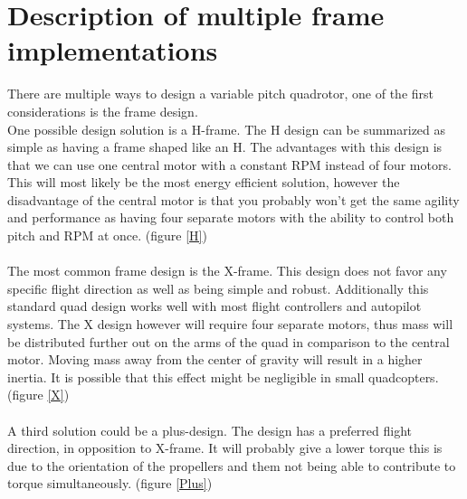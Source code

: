 \section{Description of multiple frame implementations}

There are multiple ways to design a variable pitch quadrotor, one of the first considerations is the frame design. 
\\
One possible design solution is a H-frame. The H design can be summarized as simple as having a frame shaped like an H. The advantages with this design is that we can use one central motor with a constant RPM instead of four motors. This will most likely be the most energy efficient solution, however the disadvantage of the central motor is that you probably won't  get the same agility and performance as having four separate motors with the ability to control both pitch and RPM at once. (figure \ref{H})
\\\\
The most common frame design is the X-frame. This design does not favor any specific flight direction as well as being simple and robust. Additionally this standard quad design works well with most flight controllers and autopilot systems. The X design however will require four separate motors, thus mass will be distributed further out on the arms of the quad in comparison to the central motor. Moving mass away from the center of gravity will result in a higher inertia. It is possible that this effect might be negligible in small quadcopters. (figure \ref{X})
\\\\
A third solution could be a plus-design. The design has a preferred flight direction, in opposition to X-frame. It will probably give a lower torque this is due to the orientation of the propellers and them not being able to contribute to torque simultaneously. (figure \ref{Plus})


